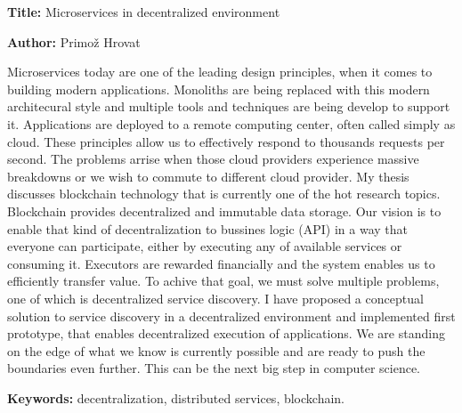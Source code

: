 \documentclass[a4paper, 12pt]{book}
\newcommand{\ttitleEn}{Microservices in decentralized environment}
\newcommand{\tauthor}{Primož Hrovat}
\newcommand{\tkeywordsEn}{decentralization, distributed services, blockchain}
\newcommand{\clearemptydoublepage}{\newpage{\pagestyle{empty}\cleardoublepage}}
\begin{document}
\noindent\textbf{Title:} \ttitleEn
\bigskip

\noindent\textbf{Author:} \tauthor
\bigskip

\noindent 

Microservices today are one of the leading design principles, when it comes to building modern applications.
Monoliths are being replaced with this modern architecural style and multiple tools and techniques are being develop to support it.
Applications are deployed to a remote computing center, often called simply as cloud.
These principles allow us to effectively respond to thousands requests per second.
The problems arrise when those cloud providers experience massive breakdowns or we wish to commute to different cloud provider.
My thesis discusses blockchain technology that is currently one of the hot research topics.
Blockchain provides decentralized and immutable data storage.
Our vision is to enable that kind of decentralization to bussines logic (API) in a way that everyone can participate, either by executing any of available services or consuming it.
Executors are rewarded financially and the system enables us to efficiently transfer value.
To achive that goal, we must solve multiple problems, one of which is decentralized service discovery.
I have proposed a conceptual solution to service discovery in a decentralized environment and implemented first prototype, that enables decentralized execution of applications.
We are standing on the edge of what we know is currently possible and are ready to push the boundaries even further. This can be the next big step in computer science.

\bigskip

\noindent\textbf{Keywords:} \tkeywordsEn.
\clearemptydoublepage

\mainmatter
\setcounter{page}{1}
\pagestyle{fancy}
\end{document}
